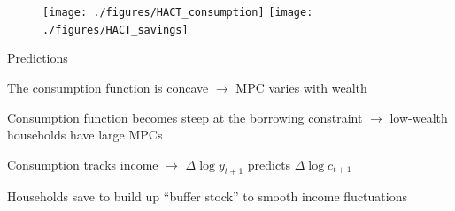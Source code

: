 \documentclass[11pt, aspectratio=169]{beamer}
\newenvironment{witemize}{\itemize\addtolength{\itemsep}{10pt}}{\enditemize}
\begin{document}
\begin{frame}{}
	\begin{figure}
		\texttt{[image: ./figures/HACT\_consumption]}
		\qquad
		\texttt{[image: ./figures/HACT\_savings]}
	\end{figure}
\end{frame}


\begin{frame}{Predictions}

\begin{witemize}
\item The consumption function is concave $\to$ MPC varies with wealth

\item Consumption function becomes steep at the borrowing constraint $\to$ low-wealth households have large MPCs

\item Consumption tracks income $\to$ $\Delta \log y_{t+1}$ predicts $\Delta \log c_{t+1}$

\item Households save to build up ``buffer stock'' to smooth income fluctuations 
\end{witemize}
\end{frame}
\end{document}
